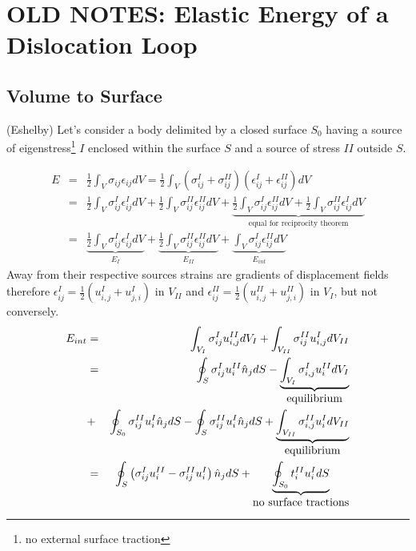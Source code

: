 \documentclass[10pt]{report}
\begin{document}
{   
   

\section{OLD NOTES: Elastic Energy of a Dislocation Loop}
\subsection{Volume to Surface}
(Eshelby) Let's consider a body delimited by a closed surface $S_0$ having a source of eigenstress\footnote{ no external surface traction}  $I$ enclosed within the surface $S$ and a source of stress $II$ outside $S$.


\begin{eqnarray}
E&=&\frac{1}{2}\int_V\sigma_{ij}\epsilon_{ij}dV=\frac{1}{2}\int_V\left(\sigma^I_{ij}+\sigma^{II}_{ij}\right)\left(\epsilon^I_{ij}+\epsilon^{II}_{ij}\right)dV\nonumber\\
&=&\frac{1}{2}\int_V\sigma^I_{ij}\epsilon^{I}_{ij}dV+\frac{1}{2}\int_V\sigma^{II}_{ij}\epsilon^{II}_{ij}dV+\underbrace{\frac{1}{2}\int_V\sigma^{I}_{ij}\epsilon^{II}_{ij}dV+\frac{1}{2}\int_V\sigma^{II}_{ij}\epsilon^{I}_{ij}dV}_{\mbox{equal for reciprocity theorem}}\nonumber\\
&=&\underbrace{\frac{1}{2}\int_V\sigma^I_{ij}\epsilon^{I}_{ij}dV}_{E_I}+\underbrace{\frac{1}{2}\int_V\sigma^{II}_{ij}\epsilon^{II}_{ij}dV}_{E_{II}}+\underbrace{\int_V\sigma^{I}_{ij}\epsilon^{II}_{ij}dV}_{E_{int}}
\end{eqnarray}
Away from their respective sources strains are gradients of displacement fields therefore $\epsilon^{I}_{ij}=\frac{1}{2}\left(u^I_{i,j}+u^I_{j,i}\right)$ in $V_{II}$ and $\epsilon^{II}_{ij}=\frac{1}{2}\left(u^{II}_{i,j}+u^{II}_{j,i}\right)$ in $V_{I}$, but not conversely.
\begin{eqnarray}
E_{int}&=&\int_{V_I}\sigma^{I}_{ij}u^{II}_{i,j}dV_I+\int_{V_{II}}\sigma^{II}_{ij}u^{I}_{i,j}dV_{II}\noindent\\
&=&\oint_{S}\sigma^{I}_{ij}u^{II}_{i}\hat{n}_jdS-\underbrace{\int_{V_I}\sigma^{I}_{i,j}u^{II}_{i}dV_I}_{\mbox{equilibrium}}\nonumber\\
&+&\oint_{S_0}\sigma^{II}_{ij}u^{I}_{i}\hat{n}_jdS-\oint_{S}\sigma^{II}_{ij}u^{I}_{i}\hat{n}_jdS+\underbrace{\int_{V_{II}}\sigma^{II}_{i,j}u^{I}_{i}dV_{II}}_{\mbox{equilibrium}}\nonumber\\
&=&\oint_{S}\left(\sigma^{I}_{ij}u^{II}_{i}-\sigma^{II}_{ij}u^{I}_{i}\right)\hat{n}_jdS+\underbrace{\oint_{S_0}t_i^{II}u_i^{I}dS}_{\mbox{no surface tractions}}
\end{eqnarray}


}
\end{document}
